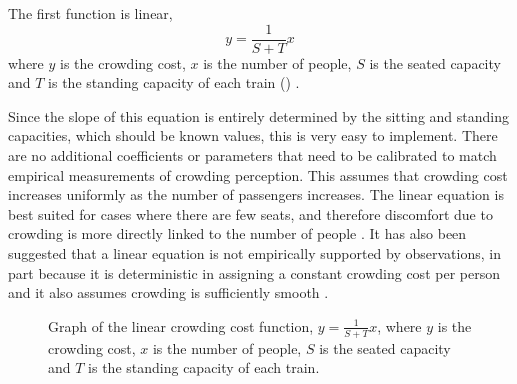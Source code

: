 \smallskip
{} 


The first function is linear,
\begin{equation}
    \label{eqn:linear}
    y=\frac{1}{S+T} x
\end{equation}
where $y$ is the crowding cost, $x$ is the number of people, $S$ is the seated capacity and $T$ is the standing capacity of each train () \cite{klumpenhouwerCostcrowdingModelLight2016}. 

Since the slope of this equation is entirely determined by the sitting and standing capacities, which should be known values, this is very easy to implement. There are no additional coefficients or parameters that need to be calibrated to match empirical measurements of crowding perception. This assumes that crowding cost increases uniformly as the number of passengers increases. The linear equation is best suited for cases where there are few seats, and therefore discomfort due to crowding is more directly linked to the number of people \cite{klumpenhouwerCostcrowdingModelLight2016}. It has also been suggested that a linear equation is not empirically supported by observations, in part because it is deterministic in assigning a constant crowding cost per person and it also assumes crowding is sufficiently smooth \cite{qinInvestigatingVehicleCrowding2014}. 

\begin{figure}[ht]
    \centering
    \caption[Graph of the linear crowding cost function]{Graph of the linear crowding cost function, $y=\frac{1}{S+T} x$,  where $y$ is the crowding cost, $x$ is the number of people, $S$ is the seated capacity and $T$ is the standing capacity of each train.}
    \label{fig:Crowding_linear}
\end{figure}

